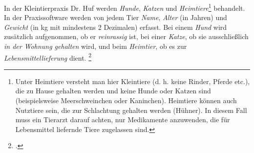 \documentclass{bschlangaul-aufgabe}
\begin{document}

In der Kleintierpraxis Dr. Huf werden \emph{Hunde}, \emph{Katzen} und
\emph{Heimtiere}\footnote{Unter Heimtiere versteht man hier Kleintiere
(d. h. keine Rinder, Pferde etc.), die zu Hause gehalten werden und
keine Hunde oder Katzen sind (beispielsweise Meerschweinchen oder
Kaninchen). Heimtiere können auch Nutztiere sein, die zur Schlachtung
gehalten werden (\zB Hühner). In diesem Fall muss ein Tierarzt darauf
achten, nur Medikamente anzuwenden, die für Lebensmittel liefernde Tiere
zugelassen sind.} behandelt. In der Praxissoftware werden von jedem Tier
\emph{Name}, \emph{Alter} (in Jahren) und \emph{Gewicht} (in kg mit
mindestens 2 Dezimalen) erfasst. Bei einem \emph{Hund} wird zusätzlich
aufgenommen, ob er \emph{reinrassig} ist, bei einer \emph{Katze}, ob sie
ausschließlich \emph{in der Wohnung gehalten} wird, und beim
\emph{Heimtier}, ob es zur \emph{Lebensmittellieferung} dient.
\footcite{oomup:ab:5}
\end{document}
